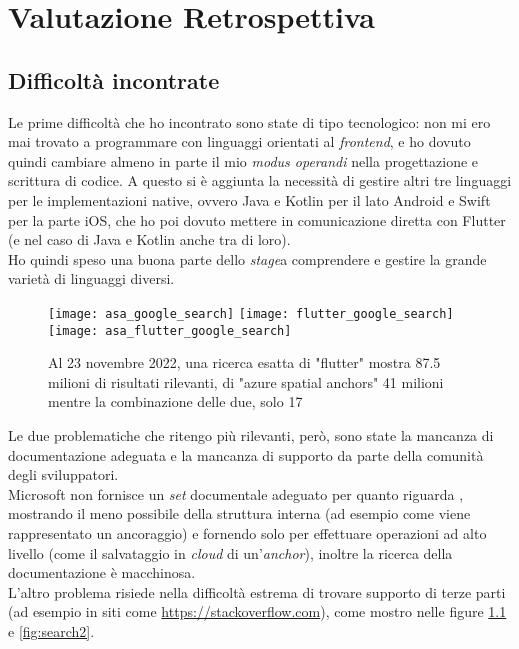 
\chapter{Valutazione Retrospettiva}
\label{cap:valutazione-retrospettiva}

\section{Difficoltà incontrate}
\label{sec:difficolta_incontrate}
Le prime difficoltà che ho incontrato sono state di tipo tecnologico: non mi ero mai trovato a programmare con linguaggi orientati al \textit{frontend}, e ho dovuto quindi cambiare almeno in parte il mio \textit{modus operandi} nella progettazione e scrittura di codice. A questo si è aggiunta la necessità di gestire altri tre linguaggi per le implementazioni native, ovvero Java e Kotlin per il lato Android e Swift per la parte iOS, che ho poi dovuto mettere in comunicazione diretta con Flutter (e nel caso di Java e Kotlin anche tra di loro).\\ 
Ho quindi speso una buona parte dello \textit{stage}a comprendere e gestire la grande varietà di linguaggi diversi.

\begin{figure}[H]
  \centering
  \texttt{[image: asa\_google\_search]}\hfill
  \texttt{[image: flutter\_google\_search]}\\
  \texttt{[image: asa\_flutter\_google\_search]}
  \caption[Ricerca esatta Flutter e ASA 23 novembre]{Al 23 novembre 2022, una ricerca esatta di "flutter" mostra 87.5 milioni di risultati rilevanti, di "azure spatial anchors" 41 milioni mentre la combinazione delle due, solo 17}
\label{fig:search1}
\end{figure}

Le due problematiche che ritengo più rilevanti, però, sono state la mancanza di documentazione adeguata e la mancanza di supporto da parte della comunità degli sviluppatori.\\
Microsoft non fornisce un \textit{set} documentale adeguato per quanto riguarda \asa{}, mostrando il meno possibile della struttura interna (ad esempio come viene rappresentato un ancoraggio) e fornendo solo \api{} per effettuare operazioni ad alto livello (come il salvataggio in \textit{cloud} di un'\textit{anchor}), inoltre la ricerca della documentazione è macchinosa.\\
L'altro problema risiede nella difficoltà estrema di trovare supporto di terze parti (ad esempio in siti come \url{https://stackoverflow.com}), come mostro nelle figure \ref{fig:search1} e \ref{fig:search2}.

